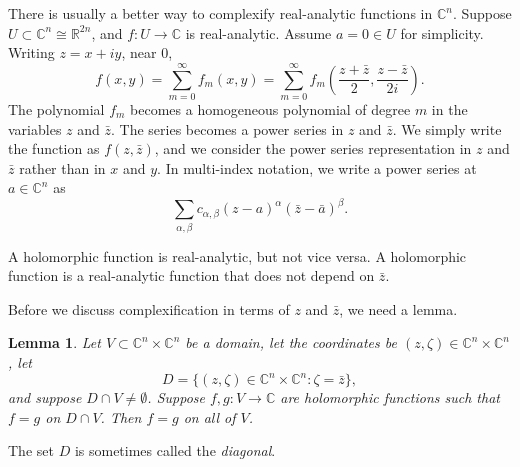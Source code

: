 \documentclass[12pt,openany]{book}
\newcommand{\C}{{\mathbb{C}}}
\newcommand{\R}{{\mathbb{R}}}
\newcommand{\myindex}[1]{#1\index{#1}}
\theoremstyle{plain}
\newtheorem{lemma}[thm]{Lemma}
\theoremstyle{remark}
\theoremstyle{definition}
\theoremstyle{exercise}
\theoremstyle{example}
\begin{document}
There is usually a better way to complexify
real-analytic functions in $\C^n$.
Suppose $U \subset \C^n \cong \R^{2n}$, and $f \colon U \to
\C$ is real-analytic.  Assume $a=0 \in U$ for simplicity.
Writing $z = x+iy$, near $0$,
\begin{equation*}
f(x,y)
=
\sum_{m=0}^\infty
f_m(x,y)
=
\sum_{m=0}^\infty
f_m\left(
\frac{z+\bar{z}}{2},
\frac{z-\bar{z}}{2i}\right) .
\end{equation*}
The polynomial $f_m$ becomes a homogeneous polynomial of degree $m$
in the variables $z$ and $\bar{z}$.  The
series becomes a power series in $z$ and $\bar{z}$.
We simply write the function as $f(z,\bar{z})$, and we consider the
power series representation in $z$ and $\bar{z}$ rather than
in $x$ and $y$.
In multi-index notation, we write a power series at $a \in \C^n$ as
\begin{equation*}
\sum_{\alpha,\beta} c_{\alpha,\beta} {(z-a)}^\alpha
{(\bar{z}-\bar{a})}^\beta .
\end{equation*}

A holomorphic function
is real-analytic, but not vice versa.  A holomorphic function
is a real-analytic function that does not depend on $\bar{z}$.

Before we discuss complexification in terms of $z$ and $\bar{z}$, we need
a lemma.

\begin{lemma}
Let $V \subset \C^n \times \C^n$ be a domain, let the coordinates be $(z,\zeta) \in \C^n \times
\C^n$, let
\begin{equation*}
D = \bigl\{ (z,\zeta) \in \C^n \times \C^n : \zeta = \bar{z} \bigr\},
\end{equation*}
and suppose $D \cap V \not= \emptyset$.
Suppose $f,g \colon V \to \C$ are holomorphic functions such that
$f=g$ on $D \cap V$.  Then $f=g$ on all of $V$.
\end{lemma}

The set $D$ is sometimes called the \emph{\myindex{diagonal}}.
\end{document}

